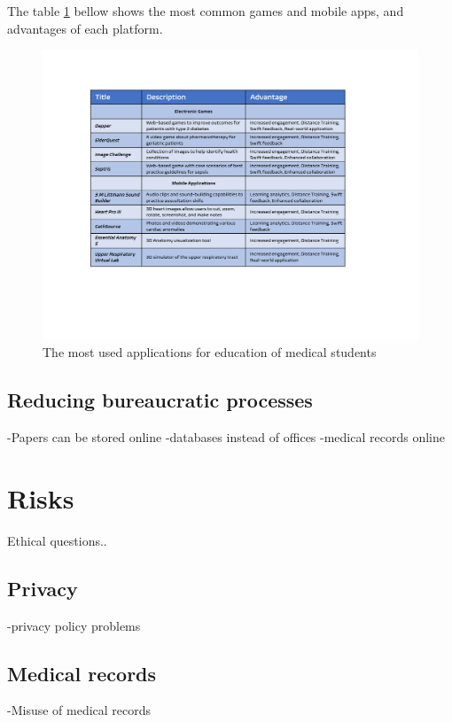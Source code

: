 \documentclass[10pt,twoside,english,a4paper]{article}
\begin{document}
The table \ref{f:table 1} bellow shows the most common games and mobile apps, and advantages of each platform\cite{https://doi.org/10.1002/ca.23916}.

\begin{figure}[tbh]
\centering
\includegraphics[width=1.0\linewidth]{table1.pdf}
\caption{The most used applications for education of medical students}
\label{f:table 1}
\end{figure}



\subsection{Reducing bureaucratic processes} \label{bureau}
-Papers can be stored online
-databases instead of offices
-medical records online


%
%
%

\section{Risks} \label{risks}
Ethical questions..

\subsection{Privacy}\label{privacy}
-privacy policy problems

\subsection{Medical records} \label{records}
-Misuse of medical records
\end{document}
